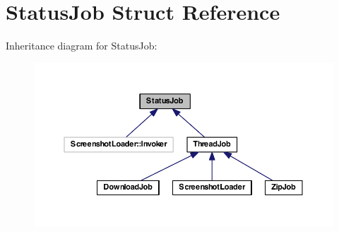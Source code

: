 \hypertarget{struct_status_job}{\section{Status\-Job Struct Reference}
\label{struct_status_job}
}


Inheritance diagram for Status\-Job\-:
\nopagebreak
\begin{figure}[H]
\begin{center}
\leavevmode
\includegraphics[width=350pt]{struct_status_job__inherit__graph}
\end{center}
\end{figure}

